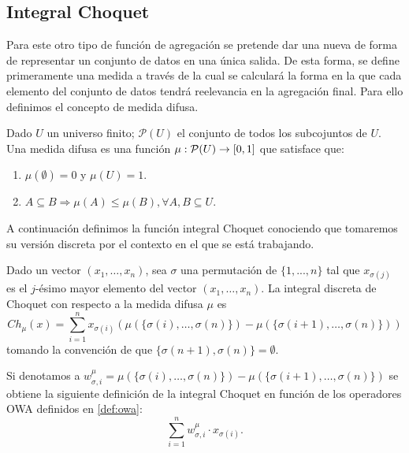 \documentclass[main]{subfiles}
\begin{document}
\subsection{Integral Choquet}
Para este otro tipo de función \cite{art:choquet, art:sugenochoquet} de agregación se pretende dar una nueva de forma de representar un conjunto de datos en una única salida. De esta forma, se define primeramente una medida a través de la cual se calculará la forma en la que cada elemento del conjunto de datos tendrá reelevancia en la agregación final. Para ello definimos el concepto de medida difusa.
\begin{definition}\label{def:medidadifusa}
Dado $U$ un universo finito; ${\mathcal{P}(U)}$ el conjunto de todos los subcojuntos de $U$. Una medida difusa es una función ${\mu:\mathcal{P}(U)\rightarrow[0,1]}$ que satisface que:
\begin{enumerate}
	\item $\mu(\emptyset)=0$ y $\mu(U)=1$.
	\item $A\subseteq B \Rightarrow \mu(A)\leq\mu (B), \forall A, B \subseteq U$.
\end{enumerate}
\end{definition}

A continuación definimos la función integral Choquet conociendo que tomaremos su versión discreta por el contexto en el que se está trabajando.

\begin{definition}\label{def:choquet}
Dado un vector ${(x_1,\dots,x_n)}$, sea $\sigma$ una permutación de ${\{1,...,n\}}$ tal que $x_{\sigma(j)}$ es el $j$-ésimo mayor elemento del vector ${(x_{1},\dots,x_{n})}$. La integral discreta de Choquet con respecto a la medida difusa $\mu$ es
$$Ch_{\mu}(x)=\sum_{i=1}^{n}x_{\sigma(i)}(\mu(\{\sigma(i),\dots,\sigma(n)\})-\mu(\{\sigma(i+1),\dots,\sigma(n)\}))$$
tomando la convención de que ${\{\sigma(n+1),\sigma(n)\}=\emptyset}$.
\end{definition}

\begin{proposition}\label{prop:choque2owa}
Si denotamos a ${w_{\sigma, i}^{\mu} = \mu(\{\sigma(i),\dots,\sigma(n)\})-\mu(\{\sigma(i+1),\dots,\sigma(n)\})}$ se obtiene la siguiente definición de la integral Choquet en función de los operadores OWA definidos en \ref{def:owa}:
$$\sum_{i=1}^{n} w_{\sigma, i}^{\mu} \cdot x_{\sigma(i)}.$$
\end{proposition}
\end{document}
